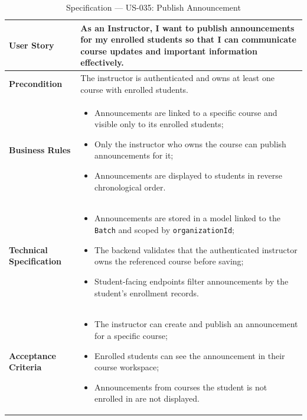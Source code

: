 \begin{table}[H]
\centering
\caption{Specification — US-035: Publish Announcement}
\label{tab:us035}
\renewcommand{\arraystretch}{1.2}
\begin{tabularx}{\textwidth}{|p{3.5cm}|X|}
\hline
\textbf{User Story} & As an Instructor, I want to publish announcements for my enrolled students so that I can communicate course updates and important information effectively. \\
\hline
\textbf{Precondition} & The instructor is authenticated and owns at least one course with enrolled students. \\
\hline
\textbf{Business Rules} &
\begin{itemize}[noitemsep, topsep=2pt]
  \item Announcements are linked to a specific course and visible only to its enrolled students;
  \item Only the instructor who owns the course can publish announcements for it;
  \item Announcements are displayed to students in reverse chronological order.
\end{itemize} \\
\hline
\textbf{Technical Specification} &
\begin{itemize}[noitemsep, topsep=2pt]
  \item Announcements are stored in a model linked to the \texttt{Batch} and scoped by \texttt{organizationId};
  \item The backend validates that the authenticated instructor owns the referenced course before saving;
  \item Student-facing endpoints filter announcements by the student's enrollment records.
\end{itemize} \\
\hline
\textbf{Acceptance Criteria} &
\begin{itemize}[noitemsep, topsep=2pt]
  \item The instructor can create and publish an announcement for a specific course;
  \item Enrolled students can see the announcement in their course workspace;
  \item Announcements from courses the student is not enrolled in are not displayed.
\end{itemize} \\
\hline
\end{tabularx}
\end{table}


